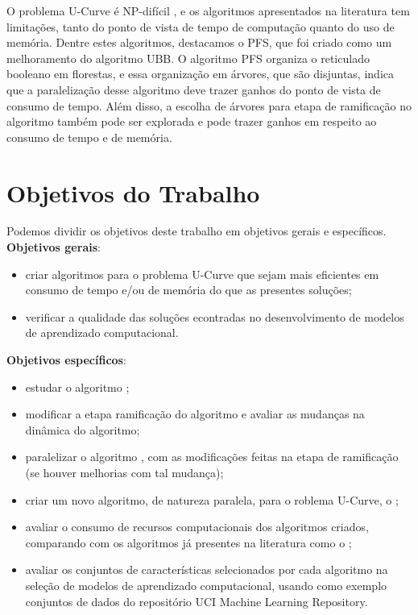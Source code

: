 O problema U-Curve é NP-difícil \cite{REI12}, e os algoritmos 
apresentados na literatura tem limitações, tanto do ponto de vista de
tempo de computação quanto do uso de memória. Dentre estes algoritmos,
destacamos o PFS, que foi criado como um melhoramento do algoritmo UBB. 
O algoritmo PFS organiza o reticulado booleano em florestas, e essa 
organização em árvores, que são disjuntas, indica que a paralelização 
desse algoritmo deve trazer ganhos do ponto de vista de consumo de 
tempo. Além disso, a escolha de árvores para etapa de ramificação no 
algoritmo também pode ser explorada e pode trazer ganhos em respeito ao
consumo de tempo e de memória.

\section{Objetivos do Trabalho}
Podemos dividir os objetivos deste trabalho em objetivos gerais e 
específicos.
{\bf Objetivos gerais}:
\begin{itemize}
\item{criar algoritmos para o problema U-Curve que sejam mais eficientes
em consumo de tempo e/ou de memória do que as presentes soluções;}
\item{verificar a qualidade das soluções econtradas no desenvolvimento
de modelos de aprendizado computacional.}
\end{itemize}
{\bf Objetivos específicos}:
\begin{itemize}
\item{estudar o algoritmo ;}
\item{modificar a etapa ramificação do algoritmo  e avaliar
as mudanças na dinâmica do algoritmo;}
\item{paralelizar o algoritmo , com as modificações feitas
na etapa de ramificação (se houver melhorias com tal mudança);}
\item{criar um novo algoritmo, de natureza paralela, para o roblema 
U-Curve, o ;}
\item{avaliar o consumo de recursos computacionais dos algoritmos 
criados, comparando com os algoritmos já presentes na literatura como
o ;}
\item{avaliar os conjuntos de características selecionados por cada 
algoritmo na seleção de modelos de aprendizado computacional, usando 
como exemplo conjuntos de dados do repositório UCI Machine Learning 
Repository.}
\end{itemize}
